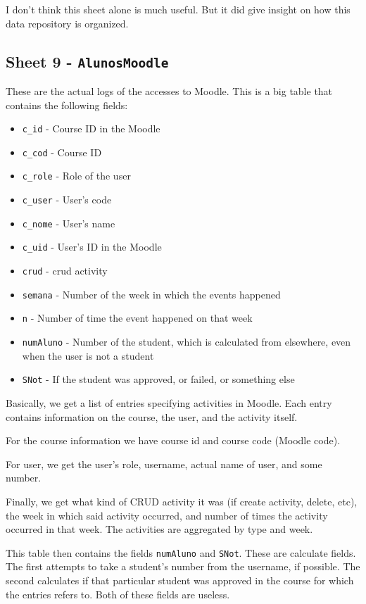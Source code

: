 I don't think this sheet alone is much useful. But it did give insight on how
this data repository is organized.

\subsection{Sheet 9 - \texttt{AlunosMoodle}}

These are the actual logs of the accesses to Moodle. This is a big table that
contains the following fields:

\begin{itemize}
    \item \texttt{c\_id} - Course ID in the Moodle
    \item \texttt{c\_cod} - Course ID
    \item \texttt{c\_role} - Role of the user
    \item \texttt{c\_user} - User's code
    \item \texttt{c\_nome} - User's name
    \item \texttt{c\_uid} - User's ID in the Moodle
    \item \texttt{crud} - \gls{crud} activity
    \item \texttt{semana} - Number of the week in which the events happened
    \item \texttt{n} - Number of time the event happened on that week
    \item \texttt{numAluno} - Number of the student, which is calculated from
        elsewhere, even when the user is not a student
    \item \texttt{SNot} - If the student was approved, or failed, or something
        else
\end{itemize}

Basically, we get a list of entries specifying activities in Moodle. Each entry
contains information on the course, the user, and the activity itself.

For the course information we have course id and course code (Moodle code).

For user, we get the user's role, username, actual name of user, and some
number.

Finally, we get what kind of CRUD activity it was (if create activity, delete,
etc), the week in which said activity occurred, and number of times the
activity occurred in that week. The activities are aggregated by type and week.

This table then contains the fields \texttt{numAluno} and \texttt{SNot}. These
are calculate fields. The first attempts to take a student's number from the
username, if possible. The second calculates if that particular student was
approved in the course for which the entries refers to. Both of these fields
are useless.

